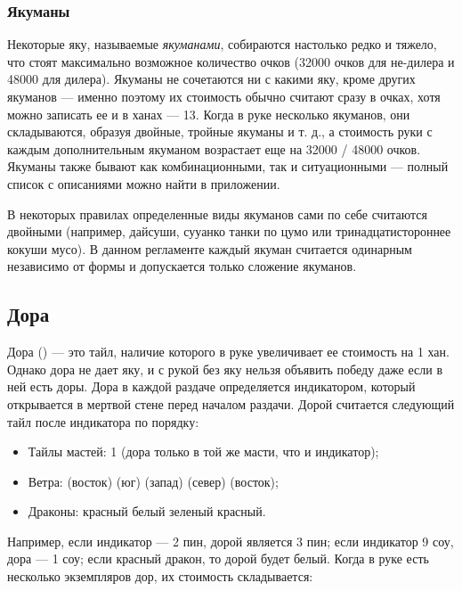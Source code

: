\subsubsection{Якуманы}

Некоторые яку, называемые \textit{якуманами}, собираются настолько редко и тяжело, что стоят максимально возможное количество очков (32000 очков для не-дилера и 48000 для дилера). Якуманы не сочетаются ни с какими яку, кроме других якуманов --- именно поэтому их стоимость обычно считают сразу в очках, хотя можно записать ее и в ханах --- 13. Когда в руке несколько якуманов, они складываются, образуя двойные, тройные якуманы и т. д., а стоимость руки с каждым дополнительным якуманом возрастает еще на 32000 / 48000 очков. Якуманы также бывают как комбинационными, так и ситуационными --- полный список с описаниями можно найти в приложении.

В некоторых правилах определенные виды якуманов сами по себе считаются двойными (например, дайсуши, сууанко танки по цумо или тринадцатистороннее кокуши мусо). В данном регламенте каждый якуман считается одинарным независимо от формы и допускается только сложение якуманов.

\subsection{Дора}

Дора () --- это тайл, наличие которого в руке увеличивает ее стоимость на 1 хан. Однако дора не дает яку, и с рукой без яку нельзя объявить победу даже если в ней есть доры. Дора в каждой раздаче определяется индикатором, который открывается в мертвой стене перед началом раздачи. Дорой считается следующий тайл после индикатора по порядку:
\begin{itemize}
	\item Тайлы мастей: 1 (дора только в той же масти, что и индикатор);
	\item Ветра:  (восток)\rightarrow
	 (юг)\rightarrow
	 (запад)\rightarrow
	 (север)\rightarrow
	 (восток);
	\item Драконы: красный\rightarrow
	белый\rightarrow
	зеленый\rightarrow
	красный.
\end{itemize}

Например, если индикатор --- 2 пин, дорой является 3 пин; если индикатор 9 соу, дора --- 1 соу; если красный дракон, то дорой будет белый.
Когда в руке есть несколько экземпляров дор, их стоимость складывается:

